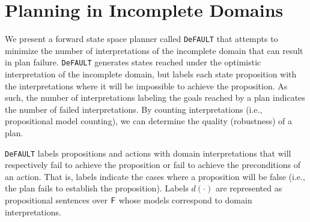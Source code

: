 \documentclass{article}
\def\und#1{\noindent{\bf #1}:}
\def\FFRISKY{{\tt DeFAULT}}
\def\und#1{\medskip{\noindent\bf #1:}}
\begin{document}
%
%
%

\section{Planning in Incomplete Domains}

We present a forward state space planner called \FFRISKY{} that attempts to minimize the number of interpretations of the incomplete domain that can result in plan failure.  \FFRISKY{} generates states reached under the optimistic interpretation of the incomplete domain, but labels each state proposition with the interpretations where it will be impossible to achieve the proposition.  As such, the number of interpretations labeling the goals reached by a plan indicates the number of failed interpretations.  By counting interpretations (i.e., propositional model counting), we can determine the quality (robustness) of a plan.

\FFRISKY{} labels propositions and actions with domain interpretations that will respectively fail to achieve the proposition or fail to achieve the preconditions of an action.  That is, labels indicate the cases where a proposition will be false (i.e., the plan fails to establish the proposition).  Labels $d(\cdot)$ are represented as  propositional sentences over ${\sf F}$ whose models correspond to domain interpretations.  
\end{document}
